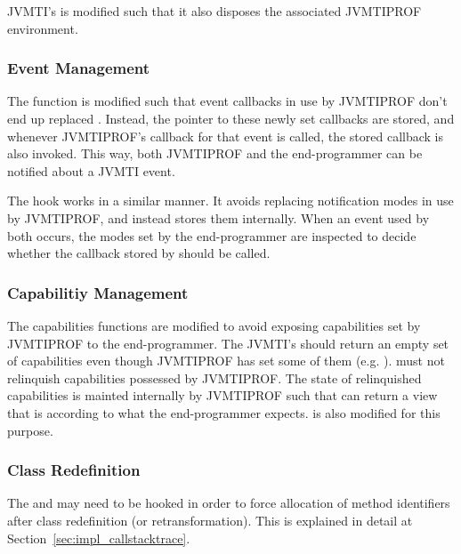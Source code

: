 JVMTI's  is modified such that it also disposes the associated JVMTIPROF environment.

\subsubsection*{Event Management}

The  function is modified such that event callbacks in use by JVMTIPROF don't end up replaced . Instead, the pointer to these newly set callbacks are stored, and whenever JVMTIPROF's callback for that event is called, the stored callback is also invoked. This way, both JVMTIPROF and the end-programmer can be notified about a JVMTI event.

The  hook works in a similar manner. It avoids replacing notification modes in use by JVMTIPROF, and instead stores them internally. When an event used by both occurs, the modes set by the end-programmer are inspected to decide whether the callback stored by  should be called.

\subsubsection*{Capabilitiy Management}

The capabilities functions are modified to avoid exposing capabilities set by JVMTIPROF to the end-programmer. The JVMTI's  should return an empty set of capabilities even though JVMTIPROF has set some of them (e.g. ).  must not relinquish capabilities possessed by JVMTIPROF. The state of relinquished capabilities is mainted internally by JVMTIPROF such that  can return a view that is according to what the end-programmer expects.  is also modified for this purpose.


\subsubsection*{Class Redefinition}

The  and  may need to be hooked in order to force allocation of method identifiers after class redefinition (or retransformation). This is explained in detail at Section~\ref{sec:impl_callstacktrace}.

